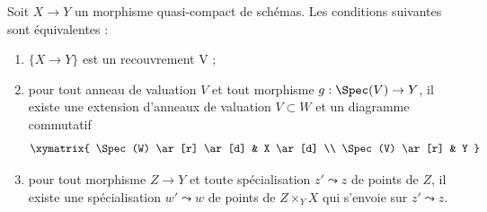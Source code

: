 \begin{lemma}
\label{lemma-refine-qcqs-V}
Soit $X \to Y$ un morphisme quasi-compact de schémas.
Les conditions suivantes sont équivalentes :
\begin{enumerate}
\item $\{X \to Y\}$ est un recouvrement V ;
\item pour tout anneau de valuation $V$ et tout morphisme $g : \Spec(V) \to Y$,
il existe une extension d'anneaux de valuation $V \subset W$
et un diagramme commutatif
$$
\xymatrix{
\Spec(W) \ar[r] \ar[d] & X \ar[d] \\
\Spec(V) \ar[r] & Y
}
$$
\item pour tout morphisme $Z \to Y$ et toute spécialisation $z' \leadsto z$
de points de $Z$, il existe une spécialisation $w' \leadsto w$
de points de $Z \times_Y X$ qui s'envoie sur $z' \leadsto z$.
\end{enumerate}
\end{lemma}

